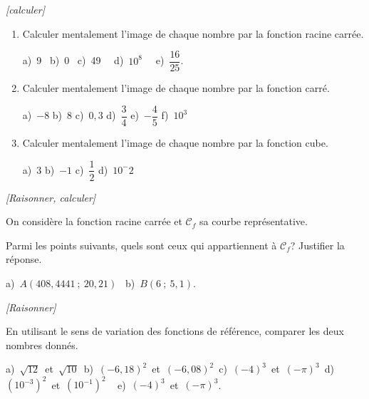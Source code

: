 \exo \textit{[calculer]}

 \begin{enumerate}
\item Calculer mentalement l'image de chaque nombre par la fonction racine carrée.

a)~9~ \hspace{0.8cm }b)~0~ \hspace{0.8cm}c)~49~~ \hspace{0.8cm}d)~$10^8$~~ \hspace{0.8cm}e)~$\dfrac{16}{25}$.

\item Calculer mentalement l'image de chaque nombre par la fonction carré.

a)~$-8$ \hspace{0,5cm} b)~$8$ \hspace{0,5cm} c)~$0,3$ \hspace{0,5cm} d)~$\dfrac{3}{4}$ \hspace{0,5cm} e)~$-\dfrac{4}{5}$ \hspace{0,5cm} f)~$10^3$ \hspace{0,5cm}

\item Calculer mentalement l'image de chaque nombre par la fonction cube.

a)~$3$ \hspace{0,5cm} b)~$-1$ \hspace{0,5cm} c)~$\dfrac{1}{2}$ \hspace{0,5cm} d)~$10^-2$ \hspace{0,5cm} 
\end{enumerate}

\exo \textit{[Raisonner, calculer]}

On considère la fonction racine carrée et $\mathcal{C}_f$ sa courbe représentative.

Parmi les points suivants, quels sont ceux qui appartiennent à $\mathcal{C}_f$? Justifier la réponse.

a)~$A(408,4441~;~20,21)$~ \hspace{0.8cm }b)~$B(6~;~5,1)$.

\medskip

\exo \textit{[Raisonner]}

En utilisant le sens de variation des fonctions de référence,  comparer les deux nombres donnés. 

\medskip

a)~$\sqrt{12}$~et~$\sqrt{10}$~\hspace{0.6cm}b)~${(-6,18)}^2$~et~$(-6,08)^2$~\hspace{0.6cm}c)~$(-4)^3$~et~$(-\pi)^3$~\hspace{0.6cm}d)~$(10^{-3})^2$~et~$(10^{-1})^2$ ~\hspace{0.6cm} e)~$(-4)^3$~et~$(-\pi)^3$.

